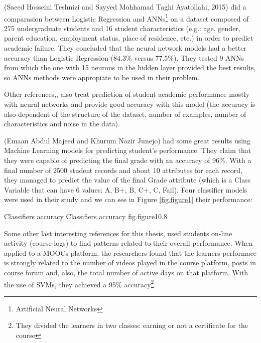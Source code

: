 (Saeed Hosseini Teshnizi and Sayyed Mohhamad Taghi Ayatollahi, 2015)\cite{bibl_3} 
did a comparasion between Logistic Regression and ANNs\footnote{Artificial 
Neural Networks} on a dataset composed of 275 undergraduate students and 16 
student characteristics (e.g.: age, gender, parent education, employment status, 
place of residence, etc.) in order to predict academic failure. They concluded that 
the neural network models had a better accuracy than Logistic Regression (84.3\% 
versus 77.5\%). They tested 9 ANNs from which the one with 15 neurons in the 
hidden layer provided the best results, so ANNs methods were appropiate to be used 
in their problem. 

Other references\cite{bibl_4},\cite{bibl_5},\cite{bibl_6} also treat prediction 
of student academic performance mostly with neural networks and provide good 
accuracy with this model (the accuracy is also dependent of the structure of 
the dataset, number of examples, number of characteristics and noise in the 
data).

(Emaan Abdul Majeed and Khurum Nazir Junejo)\cite{bibl_7} had some great results 
using Machine Learning models for predicting student's performance. They claim 
that they were capable of predicting the final grade with an accuracy of 96\%. 
With a final number of 2500 student records and about 10 attributes for each 
record, they managed to predict the value of the final Grade attribute (which 
is a Class Variable that can have 6 values: A, B+, B, C+, C, Fail). 
Four classifier models were used in their study and we can see in Figure 
\ref{fig.figure1}\cite{bibl_7} their performance: 

%
    {Classifiers accuracy}%
    {Classifiers accuracy}%
    {fig.figure1}{0.8}

Some other last interesting references for this thesis\cite{bibl_8},\cite{bibl_9} 
used students on-line activity (course logs) to find patterns related to their overall 
performance. When applied to a MOOCs platform\cite{bibl_9}, the researchers found 
that the learners performace is strongly related to the number of videos played 
in the course platform, posts in course forum and, also, the total number of active 
days on that platform. With the use of SVMs, they achieved a 95\% accuracy\footnote{They 
divided the learners in two classes: earning or not a certificate for the course}. 